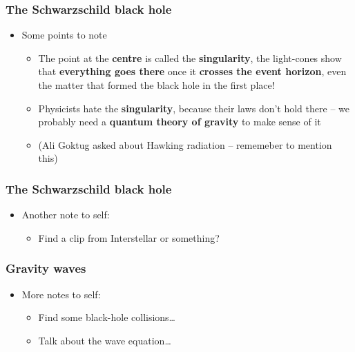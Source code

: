 \documentclass{beamer}
\begin{document}
\begin{frame}
  \frametitle{The Schwarzschild black hole}
  \begin{itemize}
    \item<1-> Some points to note
      \begin{itemize}
	\item<2-> The point at the \textbf{centre} is called the \textbf{singularity}, the light-cones show that \textbf{everything goes there} once it \textbf{crosses the event horizon}, even the matter that formed the black hole in the first place!
	\item<3-> Physicists hate the \textbf{singularity}, because their laws don't hold there -- we probably need a \textbf{quantum theory of gravity} to make sense of it
	\item<4-> (Ali Goktug asked about Hawking radiation -- rememeber to mention this)
      \end{itemize}
  \end{itemize}
\end{frame}

\begin{frame}
  \frametitle{The Schwarzschild black hole}
  \begin{itemize}
    \item<1-> Another note to self:
      \begin{itemize}
	\item<2-> Find a clip from Interstellar or something?
      \end{itemize}
  \end{itemize}
\end{frame}

\begin{frame}
  \frametitle{Gravity waves}
  \begin{itemize}
    \item<1-> More notes to self:
      \begin{itemize}
	\item<2-> Find some black-hole collisions\ldots
	\item<3-> Talk about the wave equation\ldots
      \end{itemize}
  \end{itemize}
\end{frame}
\end{document}
